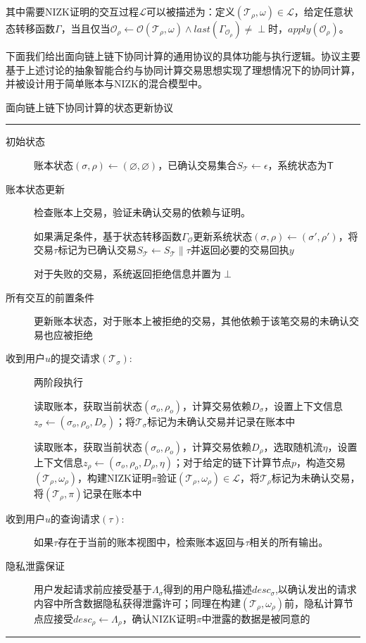 其中需要NIZK证明的交互过程$\mathcal{L}$可以被描述为：定义$(\mathcal{T}_\rho, \omega) \in \mathcal{L}$，给定任意状态转移函数$\Gamma$，当且仅当$\mathcal{O}_\rho \leftarrow \mathcal{O}(\mathcal{T}_\rho, \omega)\wedge last(\Gamma_{\mathcal{O}_\rho}) \neq \perp$时，$apply(\mathcal{O}_\rho)$。

下面我们给出面向链上链下协同计算的通用协议的具体功能与执行逻辑。协议主要基于上述讨论的抽象智能合约与协同计算交易思想实现了理想情况下的协同计算，并被设计用于简单账本与NIZK的混合模型中。

\begin{center}
    面向链上链下协同计算的状态更新协议
\end{center}
\noindent\hrule
\begin{description}
    \item[初始状态] 账本状态$(\sigma, \rho) \leftarrow (\varnothing, \varnothing)$，已确认交易集合$S_\mathcal{T} \leftarrow \epsilon$，系统状态为$\mathsf{T}$
    
    \item[账本状态更新] 检查账本上交易，验证未确认交易的依赖与证明。
    
    如果满足条件，基于状态转移函数$\Gamma_{\mathcal{O}}$更新系统状态$(\sigma, \rho) \leftarrow (\sigma', \rho')$，将交易$\tau$标记为已确认交易$S_\mathcal{T} \leftarrow S_\mathcal{T}\parallel\tau$并返回必要的交易回执$y$

    对于失败的交易，系统返回拒绝信息并置为$\perp$

    \item[所有交互的前置条件] 更新账本状态，对于账本上被拒绝的交易，其他依赖于该笔交易的未确认交易也应被拒绝

    \item[收到用户$u$的提交请求$(\mathcal{T}_\sigma)$:] 两阶段执行
    
    \subitem [stage 1] 读取账本，获取当前状态$(\sigma_o, \rho_o)$，计算交易依赖$D_\sigma$，设置上下文信息$z_\sigma \leftarrow (\sigma_o, \rho_o, D_\sigma)$；将$\mathcal{T}_\sigma$标记为未确认交易并记录在账本中
    
    \subitem [stage 2] 读取账本，获取当前状态$(\sigma_o, \rho_o)$，计算交易依赖$D_\rho$，选取随机流$\eta$，设置上下文信息$z_\rho \leftarrow (\sigma_o, \rho_o, D_\rho, \eta)$；对于给定的链下计算节点$\mathit{p}$，构造交易$(\mathcal{T}_\rho, \omega_\rho)$，构建NIZK证明$\pi$验证$(\mathcal{T}_\rho, \omega_\rho) \in \mathcal{L}$，将$\mathcal{T}_\rho$标记为未确认交易，将$(\mathcal{T}_\rho, \pi)$记录在账本中

    \item[收到用户$u$的查询请求$(\tau)$:] 如果$\tau$存在于当前的账本视图中，检索账本返回与$\tau$相关的所有输出。
    
    \item[隐私泄露保证] 用户发起请求前应接受基于$\Lambda_\sigma$得到的用户隐私描述$desc_\sigma$,以确认发出的请求内容中所含数据隐私获得泄露许可；同理在构建$(\mathcal{T}_\rho, \omega_\rho)$前，隐私计算节点应接受$desc_\rho \leftarrow \Lambda_\rho$，确认NIZK证明$\pi$中泄露的数据是被同意的
\end{description}
\noindent\hrule


